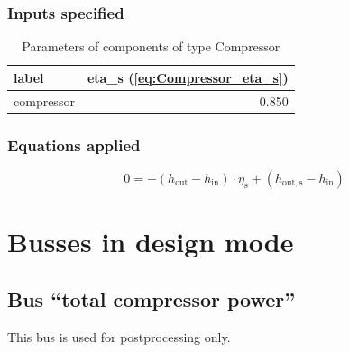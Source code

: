 \subsubsection{Inputs specified}

\begin{table}[H]\begin{center}
\begin{tabular}{lr}
\toprule
      label &  eta\_s (\ref{eq:Compressor_eta_s}) \\
\midrule
 compressor &                               0.850 \\
\bottomrule
\end{tabular}
\caption{Parameters of components of type Compressor}
\end{center}\end{table}

\subsubsection{Equations applied}

\begin{equation}
\label{eq:Compressor_eta_s}
0 =-\left(h_\mathrm{out}-h_\mathrm{in}\right)\cdot\eta_\mathrm{s}+\left(h_\mathrm{out,s}-h_\mathrm{in}\right)
\end{equation}


\section{Busses in design mode}

\subsection{Bus ``total compressor power''}

This bus is used for postprocessing only.

